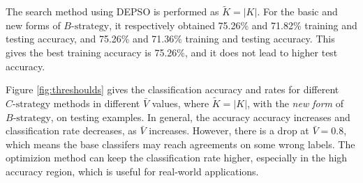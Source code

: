 The search method using DEPSO is performed as $\tilde{K}=|K|$. For the basic and new forms of $B\text{-strategy}$, it respectively obtained 75.26\% and 71.82\% training and testing accuracy, and 75.26\% and 71.36\% training and testing accuracy. This gives the best training accuracy is 75.26\%, and it does not lead to higher test accuracy.

Figure \ref{fig:threshoulds} gives the classification accuracy and rates for different $C\text{-strategy}$ methods in different $\bar{V}$ values, where $\tilde{K}=|K|$, with the \emph{new form} of $B\text{-strategy}$, on testing examples. In general, the accuracy accuracy increases and classification rate decreases, as $\bar{V}$ increases. However, there is a drop at $\bar{V}=0.8$, which means the base classifers may reach agreements on some wrong labels. The optimizion method can keep the classification rate higher, especially in the high accuracy region, which is useful for real-world applications.

